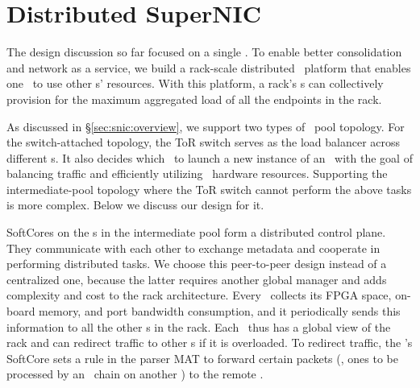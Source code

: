 \section{Distributed SuperNIC}
\label{sec:snic:dist}

The design discussion so far focused on a single \snic. To enable better consolidation and network as a service, we 
build a rack-scale distributed \snic\ platform that enables one \snic\ to use other \snic{}s' resources.
With this platform, a rack's \snic{}s can collectively provision for the maximum aggregated load of all the endpoints in the rack.

As discussed in \S\ref{sec:snic:overview}, we support two types of \snic\ pool topology.
For the switch-attached topology, the ToR switch serves as the load balancer across different \snic{}s.
It also decides which \snic\ to launch a new instance of an \nt\ with the goal of balancing traffic and efficiently utilizing \snic\ hardware resources.
Supporting the intermediate-pool topology where the ToR switch cannot perform the above tasks is more complex. Below we discuss our design for it.

SoftCores on the \snic{}s in the intermediate pool form a distributed control plane. 
They communicate with each other to exchange metadata and cooperate in performing distributed tasks. %
We choose this peer-to-peer design instead of a centralized one, because the latter requires another global manager and adds complexity and cost to the rack architecture. %
Every \snic\ collects its FPGA space, on-board memory, and port bandwidth consumption, and it periodically sends this information to all the other \snic{}s in the rack.
Each \snic\ thus has a global view of the rack and can redirect traffic to other \snic{}s if it is overloaded.
To redirect traffic, the \snic's SoftCore sets a rule in the parser MAT to forward certain packets (\eg, ones to be processed by an \nt\ chain on another \snic) to the remote \snic.



